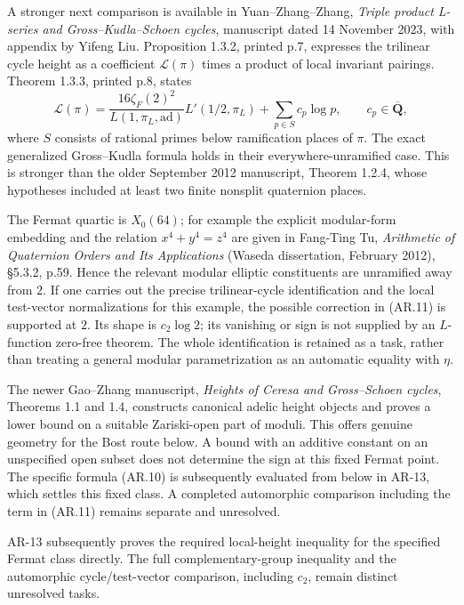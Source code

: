\documentclass[11pt,a4paper]{article}
\begin{document}
A stronger next comparison is available in Yuan--Zhang--Zhang,
\emph{Triple product L-series and Gross--Kudla--Schoen cycles},
manuscript dated 14 November 2023, with appendix by Yifeng Liu.
Proposition 1.3.2, printed p.7, expresses the trilinear cycle height as
a coefficient \(\mathcal L(\pi)\) times a product of local invariant
pairings. Theorem 1.3.3, printed p.8, states \[
\mathcal L(\pi)=
\frac{16\zeta_F(2)^2}{L(1,\pi_L,\mathrm{ad})}
 L'(1/2,\pi_L)+\sum_{p\in S}c_p\log p,
\qquad c_p\in\overline{\mathbf Q},
\tag{AR.11}
\] where \(S\) consists of rational primes below ramification places of
\(\pi\). The exact generalized Gross--Kudla formula holds in their
everywhere-unramified case. This is stronger than the older September
2012 manuscript, Theorem 1.2.4, whose hypotheses included at least two
finite nonsplit quaternion places.

The Fermat quartic is \(X_0(64)\); for example the explicit modular-form
embedding and the relation \(x^4+y^4=z^4\) are given in Fang-Ting Tu,
\emph{Arithmetic of Quaternion Orders and Its Applications} (Waseda
dissertation, February 2012), §5.3.2, p.59. Hence the relevant modular
elliptic constituents are unramified away from \(2\). If one carries out
the precise trilinear-cycle identification and the local test-vector
normalizations for this example, the possible correction in (AR.11) is
supported at \(2\). Its shape is \(c_2\log2\); its vanishing or sign is
not supplied by an \(L\)-function zero-free theorem. The whole
identification is retained as a task, rather than treating a general
modular parametrization as an automatic equality with \(\eta\).

The newer Gao--Zhang manuscript, \emph{Heights of Ceresa and
Gross--Schoen cycles}, Theorems 1.1 and 1.4, constructs canonical adelic
height objects and proves a lower bound on a suitable Zariski-open part
of moduli. This offers genuine geometry for the Bost route below. A
bound with an additive constant on an unspecified open subset does not
determine the sign at this fixed Fermat point. The specific formula
(AR.10) is subsequently evaluated from below in AR-13, which settles
this fixed class. A completed automorphic comparison including the term
in (AR.11) remains separate and unresolved.

AR-13 subsequently proves the required local-height inequality for the
specified Fermat class directly. The full complementary-group inequality
and the automorphic cycle/test-vector comparison, including \(c_2\),
remain distinct unresolved tasks.
\end{document}
